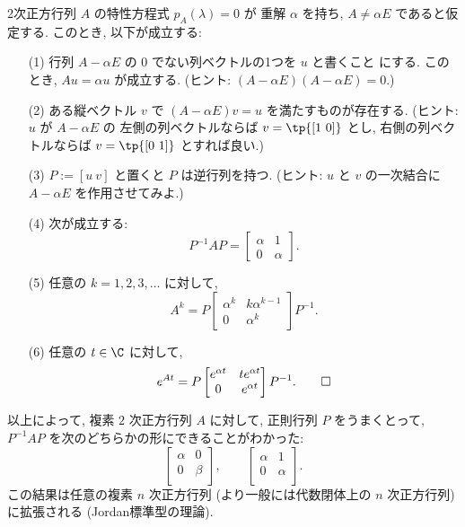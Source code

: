 \documentclass[12pt,twoside]{jarticle}
\begin{document}
\begin{question}\label{q:normal-form-2.2}
  2次正方行列 $A$ の特性方程式 $p_A(\lambda)=0$ が
  重解 $\alpha$ を持ち,  $A \ne \alpha E$ であると仮定する.
  このとき, 以下が成立する:
  \begin{enumerate}
  \item[(1)] 行列 $A - \alpha E$ の $0$ でない列ベクトルの1つを $u$ と書くこと
    にする. このとき, $Au = \alpha u$ が成立する. 
    (ヒント: $(A-\alpha E)(A-\alpha E)=0$.)
  \item[(2)] ある縦ベクトル $v$ で $(A - \alpha E)v=u$ を満たすものが存在する.
    (ヒント: $u$ が $A - \alpha E$ の
    左側の列ベクトルならば $v=\tp{[1\ 0]}$ とし, 
    右側の列ベクトルならば $v=\tp{[0\ 1]}$ とすれば良い.)
  \item[(3)] $P := [u\ v]$ と置くと $P$ は逆行列を持つ.
    (ヒント: $u$ と $v$ の一次結合に $A - \alpha E$ を作用させてみよ.)
  \item[(4)] 次が成立する:
    \begin{equation*}
      P^{-1} A P = \begin{bmatrix}\alpha & 1\\0 & \alpha\end{bmatrix}.
    \end{equation*}
  \item[(5)] 任意の $k=1,2,3,\ldots$ に対して,
    \begin{equation*}
      A^k = 
      P
      \begin{bmatrix} \alpha^k & k\alpha^{k-1} \\ 0 & \alpha^k \end{bmatrix}
      P^{-1}. 
    \end{equation*}
  \item[(6)] 任意の $t\in\C$ に対して,
    \begin{equation*}
      e^{At} =
      P
      \begin{bmatrix}
        e^{\alpha t} & t e^{\alpha t} \\
        0            &   e^{\alpha t} \\
      \end{bmatrix}
      P^{-1}.
    \qed
    \end{equation*}
  \end{enumerate}
\end{question}

以上によって, 複素 $2$ 次正方行列 $A$ に対して, 正則行列 $P$ をうまくとって,
$P^{-1}AP$ を次のどちらかの形にできることがわかった:
\begin{equation*}
  \begin{bmatrix} \alpha & 0 \\ 0 & \beta \\ \end{bmatrix},
  \qquad
  \begin{bmatrix} \alpha & 1 \\ 0 & \alpha \\ \end{bmatrix}.
\end{equation*}
この結果は任意の複素 $n$ 次正方行列 (より一般には代数閉体上の $n$ 次正方行列) 
に拡張される (Jordan標準型の理論).
\end{document}
